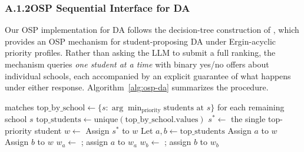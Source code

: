 \subsubsection*{A.1.2\quad OSP Sequential Interface for DA}

Our OSP implementation for DA follows the decision-tree construction of \citet{ashlagi2018stable}, which provides an OSP mechanism for student-proposing DA under Ergin-acyclic priority profiles. Rather than asking the LLM to submit a full ranking, the mechanism queries \emph{one student at a time} with binary yes/no offers about individual schools, each accompanied by an explicit guarantee of what happens under either response. Algorithm~\ref{alg:osp-da} summarizes the procedure.

\begin{algorithm}[H]
\caption{OSP Decision Tree for DA under Acyclic Priorities \citep{ashlagi2018stable}}
\label{alg:osp-da}
\begin{algorithmic}[1]
    \State \Return matches
  \EndIf
  \State $\text{top\_by\_school} \gets \{s : \arg\min_{\text{priority}} \text{students at } s\}$ for each remaining school $s$
  \State $\text{top\_students} \gets \text{unique}(\text{top\_by\_school.values})$
   
    \State $s^* \gets$ the single top-priority student
    \State $w \gets$  
    \State Assign $s^*$ to $w$
    \State \Return {}
  \EndIf
  \State Let $a, b \gets \text{top\_students}$ 
     
      \State Assign $a$ to $w$
      \State \Return {}
    \EndIf
  \EndFor
      \State Assign $b$ to $w$
      \State \Return {}
    \EndIf
  \EndFor
  \State $w_a \gets$ ; assign $a$ to $w_a$
  \State $w_b \gets$ ; assign $b$ to $w_b$
  \State \Return {}
\EndProcedure
\end{algorithmic}
\end{algorithm}

